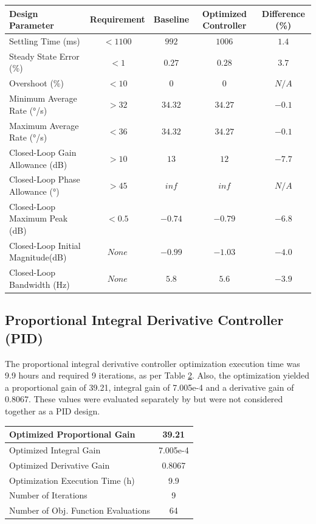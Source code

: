 \begin{table}[H]
	\label{table:5_2_3_PD_PerfTable}
	\centering
	\resizebox{14cm}{!} {
		\begin{tabular}{|l|c|c|c|c|}
			\hline
			Design Parameter & Requirement & Baseline & Optimized Controller & Difference (\%) \\ \hline
			Settling Time (ms) & $< 1100$ & $992$ & $1006$ & $1.4$ \\ \hline
			Steady State Error ($\%$) & $< 1$ & $0.27$ & $0.28$ & $3.7$ \\ \hline
			Overshoot ($\%$) & $< 10$ & $0$ & $0$ & $N/A$ \\ \hline
			Minimum Average Rate ($°$/s) & $> 32$ & $34.32$ & $34.27$ & $-0.1$ \\ \hline
			Maximum Average Rate ($°$/s) & $< 36$ & $34.32$ & $34.27$ & $-0.1$ \\ \hline
			Closed-Loop Gain Allowance (dB) & $> 10$ & $13$ & $12$ & $-7.7$ \\ \hline
			Closed-Loop Phase Allowance ($°$) & $> 45$ & $inf$ & $inf$ & $N/A$ \\ \hline
			Closed-Loop Maximum Peak (dB) & $< 0.5$ & $-0.74$ & $-0.79$ & $-6.8$ \\ \hline
			Closed-Loop Initial Magnitude(dB) & $None$ & $-0.99$ & $-1.03$ & $-4.0$ \\ \hline
			Closed-Loop Bandwidth (Hz) & $None$ & $5.8$ & $5.6$ & $-3.9$ \\ \hline
	\end{tabular}}
\end{table}

\subsection{Proportional Integral Derivative Controller (PID)}

The proportional integral derivative controller optimization execution time was 9.9 hours and required 9 iterations, as per Table \ref{table:5_2_4_PIDContExecution}. Also, the optimization yielded a proportional gain of 39.21, integral gain of 7.005e-4 and a derivative gain of 0.8067. These values were evaluated separately by  but were not considered together as a PID design.

\begin{table}[H]
	\label{table:5_2_4_PIDContExecution}
	\centering
	\resizebox{7cm}{!} {
		\begin{tabular}{|l|c|}
			\hline
			Optimized Proportional Gain & 39.21 \\ \hline
			Optimized Integral Gain & 7.005e-4 \\ \hline
			Optimized Derivative Gain & 0.8067 \\ \hline
			Optimization Execution Time (h) & 9.9 \\ \hline
			Number of Iterations & 9 \\ \hline	
			Number of Obj. Function Evaluations & 64 \\ \hline	
	\end{tabular}}
\end{table}

